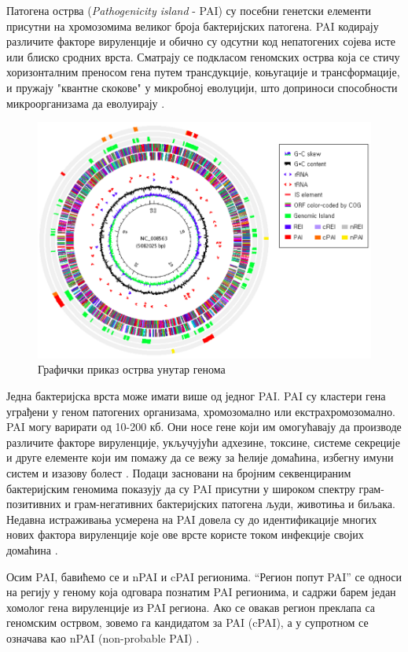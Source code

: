 \documentclass[12pt]{article}
\begin{document}
Патогена острва (\textit{Pathogenicity island} - PAI) су посебни генетски елементи присутни на хромозомима великог броја бактеријских патогена. PAI кодирају различите факторе вируленције и обично су одсутни код непатогених сојева исте или блиско сродних врста. Сматрају се подкласом геномских острва која се стичу хоризонталним преносом гена путем трансдукције, коњугације и трансформације, и пружају "квантне скокове" у микробној еволуцији, што доприноси способности микроорганизама да еволуирају \cite{Gal-Mor2006-dv}. 

\begin{figure}[htbp]
    \centering
    \vspace{0.2cm}
    \includegraphics[width=0.6\linewidth]{images/paidb.png}
    \caption{Графички приказ острва унутар генома}
    \vspace{0.5cm}
    \label{fig:islands}
\end{figure}

Једна бактеријска врста може имати више од једног PAI. PAI су кластери гена уграђени у геном патогених организама, хромозомално или екстрахромозомално. PAI могу варирати од 10-200 кб. Они носе гене који им омогућавају да производе различите факторе вируленције, укључујући адхезине, токсине, системе секреције и друге елементе који им помажу да се вежу за ћелије домаћина, избегну имуни систем и изазову болест \cite{Schmidt2004-xj}. Подаци засновани на бројним секвенцираним бактеријским геномима показују да су PAI присутни у широком спектру грам-позитивних и грам-негативних бактеријских патогена људи, животиња и биљака. Недавна истраживања усмерена на PAI довела су до идентификације многих нових фактора вируленције које ове врсте користе током инфекције својих домаћина \cite{Gal-Mor2006-dv}.

Осим PAI, бавићемо се и nPAI и cPAI регионима. ``Регион попут PAI'' се односи на регију у геному која одговара познатим PAI регионима, и садржи барем један хомолог гена вируленције из PAI региона. Ако се овакав регион преклапа са геномским острвом, зовемо га кандидатом за PAI (cPAI), а у супротном се означава као nPAI (non-probable PAI) \cite{Yoon2014-xa}.
\end{document}
